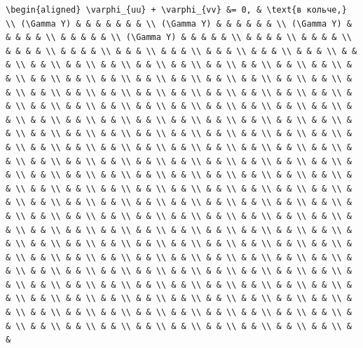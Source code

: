 \documentclass[
]{article}
\begin{document}
{{\begin{verbatim}
\begin{aligned} \varphi_{uu} + \varphi_{vv} &= 0, & \text{в кольче,} \\ (\Gamma Y) & & & & & & & \\ (\Gamma Y) & & & & & & \\ (\Gamma Y) & & & & & \\ & & & & & \\ (\Gamma Y) & & & & & \\ & & & & \\ & & & & \\ & & & & \\ & & & & \\ & & & \\ & & & \\ & & & \\ & & & \\ & & & \\ & & & \\ & & \\ & & \\ & & \\ & & \\ & & \\ & & \\ & & \\ & & \\ & & \\ & & \\ & & \\ & & \\ & & \\ & & \\ & & \\ & & \\ & & \\ & & \\ & & \\ & & \\ & & \\ & & \\ & & \\ & & \\ & & \\ & & \\ & & \\ & & \\ & & \\ & & \\ & & \\ & & \\ & & \\ & & \\ & & \\ & & \\ & & \\ & & \\ & & \\ & & \\ & & \\ & & \\ & & \\ & & \\ & & \\ & & \\ & & \\ & & \\ & & \\ & & \\ & & \\ & & \\ & & \\ & & \\ & & \\ & & \\ & & \\ & & \\ & & \\ & & \\ & & \\ & & \\ & & \\ & & \\ & & \\ & & \\ & & \\ & & \\ & & \\ & & \\ & & \\ & & \\ & & \\ & & \\ & & \\ & & \\ & & \\ & & \\ & & \\ & & \\ & & \\ & & \\ & & \\ & & \\ & & \\ & & \\ & & \\ & & \\ & & \\ & & \\ & & \\ & & \\ & & \\ & & \\ & & \\ & & \\ & & \\ & & \\ & & \\ & & \\ & & \\ & & \\ & & \\ & & \\ & & \\ & & \\ & & \\ & & \\ & & \\ & & \\ & & \\ & & \\ & & \\ & & \\ & & \\ & & \\ & & \\ & & \\ & & \\ & & \\ & & \\ & & \\ & & \\ & & \\ & & \\ & & \\ & & \\ & & \\ & & \\ & & \\ & & \\ & & \\ & & \\ & & \\ & & \\ & & \\ & & \\ & & \\ & & \\ & & \\ & & \\ & & \\ & & \\ & & \\ & & \\ & & \\ & & \\ & & \\ & & \\ & & \\ & & \\ & & \\ & & \\ & & \\ & & \\ & & \\ & & \\ & & \\ & & \\ & & \\ & & \\ & & \\ & & \\ & & \\ & & \\ & & \\ & & \\ & & \\ & & \\ & & \\ & & \\ & & \\ & & \\ & & \\ & & \\ & & \\ & & \\ & & \\ & & \\ & & \\ & & \\ & & \\ & & \\ & & \\ & & \\ & & \\ & & \\ & & \\ & & \\ & & \\ & & \\ & & \\ & & \\ & & \\ & & \\ & & \\ & & \\ & & \\ & & \\ & & 
\end{verbatim}}}
\end{document}

